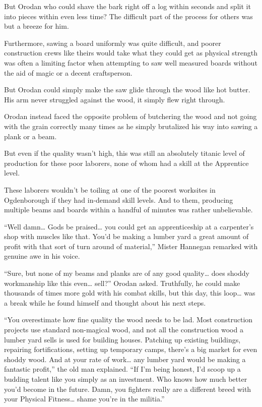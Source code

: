 \documentclass[a4paper,10pt]{book}
\begin{document}
But Orodan who could shave the bark right off a log within seconds and split it into pieces within even less time? The difficult part of the process for others was but a breeze for him.\par
Furthermore, sawing a board uniformly was quite difficult, and poorer construction crews like theirs would take what they could get as physical strength was often a limiting factor when attempting to saw well measured boards without the aid of magic or a decent craftsperson.\par
But Orodan could simply make the saw glide through the wood like hot butter. His arm never struggled against the wood, it simply flew right through.\par
Orodan instead faced the opposite problem of butchering the wood and not going with the grain correctly many times as he simply brutalized his way into sawing a plank or a beam.\par
But even if the quality wasn’t high, this was still an absolutely titanic level of production for these poor laborers, none of whom had a skill at the Apprentice level.\par
These laborers wouldn’t be toiling at one of the poorest worksites in Ogdenborough if they had in-demand skill levels. And to them, producing multiple beams and boards within a handful of minutes was rather unbelievable.\par
“Well damn… Gods be praised… you could get an apprenticeship at a carpenter’s shop with muscles like that. You’d be making a lumber yard a great amount of profit with that sort of turn around of material,” Mister Hannegan remarked with genuine awe in his voice.\par
“Sure, but none of my beams and planks are of any good quality… does shoddy workmanship like this even… sell?” Orodan asked. Truthfully, he could make thousands of times more gold with his combat skills, but this day, this loop… was a break while he found himself and thought about his next steps.\par
“You overestimate how fine quality the wood needs to be lad. Most construction projects use standard non-magical wood, and not all the construction wood a lumber yard sells is used for building houses. Patching up existing buildings, repairing fortifications, setting up temporary camps, there’s a big market for even shoddy wood. And at your rate of work… any lumber yard would be making a fantastic profit,” the old man explained. “If I’m being honest, I’d scoop up a budding talent like you simply as an investment. Who knows how much better you’d become in the future. Damn, you fighters really are a different breed with your Physical Fitness… shame you’re in the militia.”\par
\end{document}
